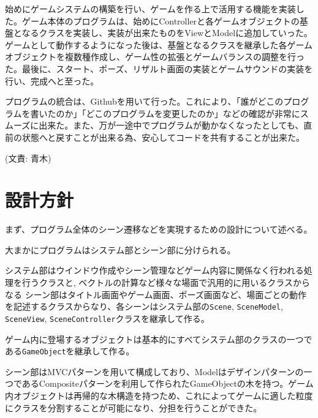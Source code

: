 \documentclass[11pt,a4j]{jarticle}
\begin{document}
始めにゲームシステムの構築を行い、ゲームを作る上で活用する機能を実装した。ゲーム本体のプログラムは、始めにControllerと各ゲームオブジェクトの基盤となるクラスを実装し、実装が出来たものをViewとModelに追加していった。ゲームとして動作するようになった後は、基盤となるクラスを継承した各ゲームオブジェクトを複数種作成し、ゲーム性の拡張とゲームバランスの調整を行った。最後に、スタート、ポーズ、リザルト画面の実装とゲームサウンドの実装を行い、完成へと至った。

プログラムの統合は、Githubを用いて行った。これにより、「誰がどこのプログラムを書いたのか」「どこのプログラムを変更したのか」などの確認が非常にスムーズに出来た。また、万が一途中でプログラムが動かなくなったとしても、直前の状態へと戻すことが出来る為、安心してコードを共有することが出来た。

(文責: 青木)

\section{設計方針}


まず、プログラム全体のシーン遷移などを実現するための設計について述べる。

大まかにプログラムはシステム部とシーン部に分けられる。

システム部はウインドウ作成やシーン管理などゲーム内容に関係なく行われる処理を行うクラスと, ベクトルの計算など様々な場面で汎用的に用いるクラスからなる
シーン部はタイトル画面やゲーム画面、ポーズ画面など、場面ごとの動作を記述するクラスからなり、各シーンはシステム部の\verb|Scene|, \verb|SceneModel|, \verb|SceneView|, \verb|SceneController|クラスを継承して作る。

ゲーム内に登場するオブジェクトは基本的にすべてシステム部のクラスの一つである\verb|GameObject|を継承して作る。

シーン部はMVCパターンを用いて構成しており、Modelはデザインパターンの一つであるCompositeパターンを利用して作られたGameObjectの木を持つ。ゲーム内オブジェクトは再帰的な木構造を持つため、これによってゲームに適した粒度にクラスを分割することが可能になり、分担を行うことができた。
\end{document}
